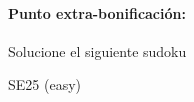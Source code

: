 \documentclass[fleqn]{article}
\begin{document}
 \paragraph*{Punto extra-bonificación:} Solucione el siguiente sudoku
 \cluefont{\Large}
 \renewcommand*{\puzzlefile}{se5.sud}
\begin{center}
\begin{minipage}{0.45\linewidth}\begin{center}
SE25 (easy) \\
\end{center}\end{minipage}
\end{center}
\end{document}
